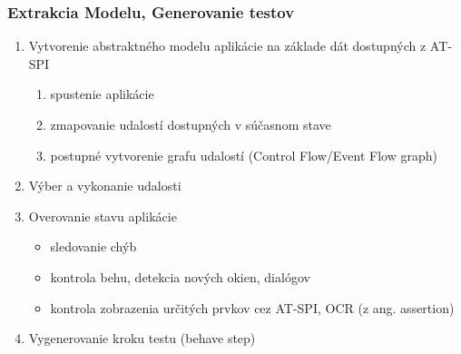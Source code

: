 \documentclass[10pt,xcolor=pdflatex,hyperref={unicode}]{beamer}
\begin{document}
\begin{frame}\frametitle{Extrakcia Modelu, Generovanie testov}
\begin{enumerate}
    \item Vytvorenie abstraktného modelu aplikácie na základe dát dostupných z AT-SPI
        \begin{enumerate}
        \item spustenie aplikácie
        \item zmapovanie udalostí dostupných v súčasnom stave
        \item postupné vytvorenie grafu udalostí (Control Flow/Event Flow graph)
    \end{enumerate}
    \item Výber a vykonanie udalosti
    \item Overovanie stavu aplikácie
    \begin{itemize}
        \item sledovanie chýb
        \item kontrola behu, detekcia nových okien, dialógov
        \item kontrola zobrazenia určitých prvkov cez AT-SPI, OCR (z ang. assertion) 
    \end{itemize}
    \item Vygenerovanie kroku testu (behave step)
\end{enumerate}

    \begin{figure}[h]
        \label{diagram}
    \end{figure}
\end{frame}
\end{document}

